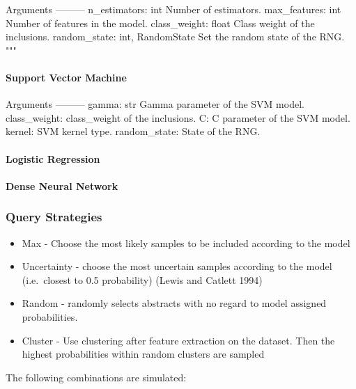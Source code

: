 \documentclass[
]{article}
\providecommand{\tightlist}{%
  \setlength{\itemsep}{0pt}\setlength{\parskip}{0pt}}
\begin{document}
Arguments --------- n\_estimators: int Number of estimators.
max\_features: int Number of features in the model. class\_weight: float
Class weight of the inclusions. random\_state: int, RandomState Set the
random state of the RNG. """

\hypertarget{support-vector-machine}{%
\paragraph{Support Vector Machine}\label{support-vector-machine}}

Arguments --------- gamma: str Gamma parameter of the SVM model.
class\_weight: class\_weight of the inclusions. C: C parameter of the
SVM model. kernel: SVM kernel type. random\_state: State of the RNG.

\hypertarget{logistic-regression}{%
\paragraph{Logistic Regression}\label{logistic-regression}}

\hypertarget{dense-neural-network}{%
\paragraph{\texorpdfstring{\textbf{Dense Neural
Network}}{Dense Neural Network}}\label{dense-neural-network}}

\hypertarget{query-strategies}{%
\subsubsection{Query Strategies}\label{query-strategies}}

\begin{itemize}
\tightlist
\item
  Max - Choose the most likely samples to be included according to the
  model
\item
  Uncertainty - choose the most uncertain samples according to the model
  (i.e.~closest to 0.5 probability) (Lewis and Catlett 1994)
\item
  Random - randomly selects abstracts with no regard to model assigned
  probabilities.
\item
  Cluster - Use clustering after feature extraction on the dataset. Then
  the highest probabilities within random clusters are sampled
\end{itemize}

The following combinations are simulated:
\end{document}
